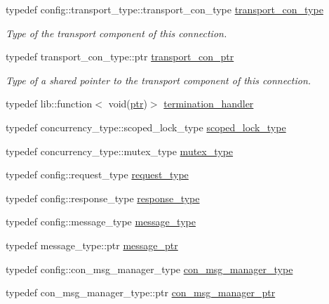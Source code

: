 \begin{DoxyCompactItemize}
typedef config\+::transport\+\_\+type\+::transport\+\_\+con\+\_\+type \hyperlink{classwebsocketpp_1_1connection_a1deb19aef8e7bde8f955ef5f952c9d19}{transport\+\_\+con\+\_\+type}
\begin{DoxyCompactList}\small\item\em Type of the transport component of this connection. \end{DoxyCompactList}\item 
typedef transport\+\_\+con\+\_\+type\+::ptr \hyperlink{classwebsocketpp_1_1connection_ad2fce7d1a535820336275ae116384738}{transport\+\_\+con\+\_\+ptr}
\begin{DoxyCompactList}\small\item\em Type of a shared pointer to the transport component of this connection. \end{DoxyCompactList}\item 
typedef lib\+::function$<$ void(\hyperlink{classwebsocketpp_1_1connection_ab910d42e3bde91546183cc54642f32ab}{ptr})$>$ \hyperlink{classwebsocketpp_1_1connection_a8da9613d1f13c9f4571ffb0810d43e63}{termination\+\_\+handler}
\item 
typedef concurrency\+\_\+type\+::scoped\+\_\+lock\+\_\+type \hyperlink{classwebsocketpp_1_1connection_a22ec65b3e3d5159ea61f885066e12caa}{scoped\+\_\+lock\+\_\+type}
\item 
typedef concurrency\+\_\+type\+::mutex\+\_\+type \hyperlink{classwebsocketpp_1_1connection_a837046a7435ad7d051ac6da827d78caa}{mutex\+\_\+type}
\item 
typedef config\+::request\+\_\+type \hyperlink{classwebsocketpp_1_1connection_ac4d9911b0954de83079ce6867a5cf57f}{request\+\_\+type}
\item 
typedef config\+::response\+\_\+type \hyperlink{classwebsocketpp_1_1connection_a0d2d5908eaaea749bcf8fd0939b05d3b}{response\+\_\+type}
\item 
typedef config\+::message\+\_\+type \hyperlink{classwebsocketpp_1_1connection_a26f1fe3979ff1d2dc5e1461e4f2bc621}{message\+\_\+type}
\item 
typedef message\+\_\+type\+::ptr \hyperlink{classwebsocketpp_1_1connection_a3b98c091caf54540024538d2394ffb57}{message\+\_\+ptr}
\item 
typedef config\+::con\+\_\+msg\+\_\+manager\+\_\+type \hyperlink{classwebsocketpp_1_1connection_aa3fe3ecba9c63a04771c2ae34dd8dd56}{con\+\_\+msg\+\_\+manager\+\_\+type}
\item 
typedef con\+\_\+msg\+\_\+manager\+\_\+type\+::ptr \hyperlink{classwebsocketpp_1_1connection_a7bcb608b3a2a645bda4e4c4998f754c7}{con\+\_\+msg\+\_\+manager\+\_\+ptr}

\end{DoxyCompactItemize}
